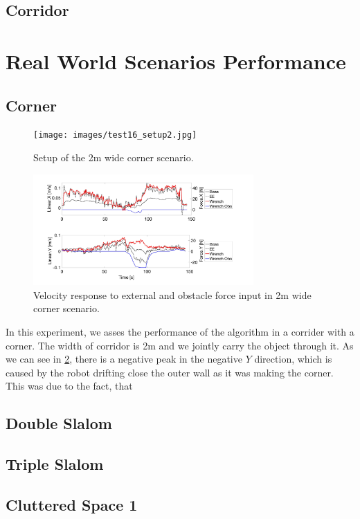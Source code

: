 \subsection{Corridor}
\section{Real World Scenarios Performance}
\subsection{Corner}
\begin{figure}
   \centering
   \texttt{[image: images/test16\_setup2.jpg]}
   \caption{Setup of the \unit{2}{m} wide corner scenario.}
   \label{pics:test16_setup}
\end{figure}

\begin{figure}
   \centering
   \includegraphics[width=0.75\textwidth]{images/test16.jpg}
   \caption{Velocity response to external and obstacle force input in \unit{2}{m} wide corner scenario.}
   \label{pics:test16}
\end{figure}

In this experiment, we asses the performance of the algorithm in a corrider with a corner. The width of corridor is \unit{2}{m} and we jointly carry the object through it. As we can see in \cref{pics:test16}, there is a negative peak in the negative $Y$
direction, which is caused by the robot drifting close the outer wall as it was making the corner. This was due to the fact, that

\subsection{Double Slalom}
\subsection{Triple Slalom}
\subsection{Cluttered Space 1}
